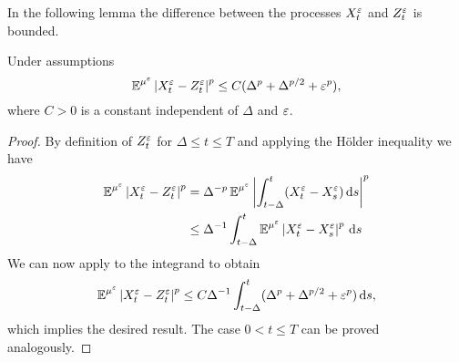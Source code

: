 \documentclass[10pt]{article}
\begin{document}
In the following lemma the difference between the processes $X_t^\varepsilon$ and $Z_t^\varepsilon$ is bounded. 
\begin{lemma}\label{lem:BoundDiffCont} Under assumptions 
	\begin{equation}
		\operatorname{\mathbb{E}}^{\mu^\varepsilon} \left\lvert X_t^\varepsilon - Z_t^\varepsilon\right\rvert^p \leq C (\Delta^p + \Delta^{p/2} + \varepsilon^p),
	\end{equation}
	where $C > 0$ is a constant independent of $\Delta$ and $\varepsilon$.
\end{lemma}
\begin{proof} By definition of $Z_t^\varepsilon$ for $\Delta \leq t \leq T$ and applying the Hölder inequality we have
	\begin{equation}
	\begin{aligned}
		\operatorname{\mathbb{E}}^{\mu^\varepsilon} \left\lvert X_t^\varepsilon - Z_t^\varepsilon\right\rvert^p &= \Delta^{-p} \operatorname{\mathbb{E}}^{\mu^\varepsilon} \left\lvert\int_{t-\Delta}^t (X_t^\varepsilon - X_s^\varepsilon) \,\mathrm{d} s\right\rvert^p \\
		&\leq \Delta^{-1} \int_{t-\Delta}^t  \operatorname{\mathbb{E}}^{\mu^\varepsilon} \left\lvert X_t^\varepsilon - X_s^\varepsilon\right\rvert^p \,\mathrm{d} s
	\end{aligned}
	\end{equation}
	We can now apply \cite[Lemma 6.1]{PaS07} to the integrand to obtain
	\begin{equation}
		\operatorname{\mathbb{E}}^{\mu^\varepsilon} \left\lvert X_t^\varepsilon - Z_t^\varepsilon\right\rvert^p \leq C\Delta^{-1} \int_{t-\Delta}^t (\Delta^p + \Delta^{p/2} + \varepsilon^p) \,\mathrm{d} s,
	\end{equation}
	which implies the desired result. The case $0 < t \leq T$ can be proved analogously.
\end{proof}
\end{document}
